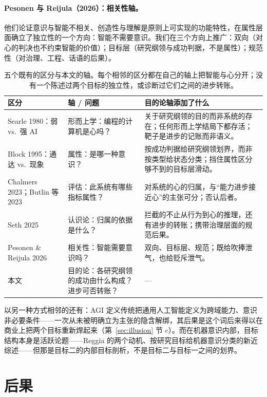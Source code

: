 \documentclass[10pt,fontset=fandol]{ctexart}
\begin{document}
\paragraph{Pesonen 与 Reijula（2026）：相关性轴。}他们论证意识与智能不相关、创造性与理解是原则上可实现的功能特性\cite{pesonen2026notobstacles}，在属性层面确立了独立性的一个方向：智能不需要意识。我们在三个方向上推广：双向（对心的判决也不约束智能的价值）；目标层（研究纲领与成功判据，不是属性）；规范性（对治理、工程、话语的后果）。

\begin{table}[t]
\centering
\small
\begin{tabularx}{\textwidth}{lYY}
\toprule
区分 & 轴 / 问题 & 目的论轴添加了什么 \\
\midrule
Searle 1980：弱 vs.\ 强 AI & 形而上学：编程的计算机是心吗？ & 关于研究纲领的目的而非系统的存在；任何形而上学结局下都存活；靶子是进步的记账而非语义。 \\
Block 1995：通达 vs.\ 现象 & 属性：是哪一种意识？ & 按成功判据给研究纲领划界，而非按类型给状态分类；挡住属性区分够不到的目标层滑动。 \\
Chalmers 2023；Butlin 等 2023 & 评估：此系统有哪些指标属性？ & 对系统的心的归属，与“能力进步接近心”的主张可分；否认后者。 \\
Seth 2025 & 认识论：归属的依据是什么？ & 拦截的不止从行为到心的推理，还有进步的转账；携带治理层面的规范后果。 \\
Pesonen \& Reijula 2026 & 相关性：智能需要意识吗？ & 双向、目标层、规范；既给吹捧泄气，也给贬斥泄气。 \\
本文 & 目的论：各研究纲领的成功由什么构成？进步可否转账？ & --- \\
\bottomrule
\end{tabularx}
\caption{五个既有的区分与本文的轴。每个相邻的区分都在自己的轴上把智能与心分开；没有一个陈述过两个目标的独立性，或诊断过它们之间的进步转账。}
\label{tab:axes}
\end{table}

以另一种方式相邻的还有：AGI 定义传统把通用人工智能定义为跨域能力、意识非必要条件\cite{goertzel2007agi}——一次从未被明确立为主张的隐含解绑，其后果是这个词后来得以在商业上把两个目标重新焊起来（第~\ref{sec:illusion} 节 c）。而在机器意识内部，目标结构本身是活跃论题——Reggia 的两个动机\cite{reggia2013rise}、按研究目标给机器意识分类的新近综述\cite{qin2025taxonomy}——但那是目标二的内部目标剖析，不是目标二与目标一之间的划界。

\section{后果}\label{sec:consequences}
\end{document}
